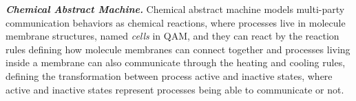 \noindent\textbf{\textit{Chemical Abstract Machine.}} Chemical abstract machine \cite{BERRY1992217} models multi-party communication behaviors as chemical reactions, where processes live in molecule membrane structures, named \textit{cells} in QAM, and they can react by the reaction rules defining how molecule membranes can connect together and processes living inside a membrane can also communicate through the heating and cooling rules, 
defining the transformation between process active and inactive states, where active and inactive states represent processes being able to communicate or not.

